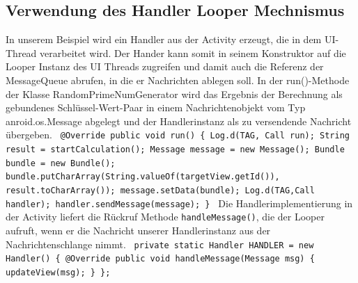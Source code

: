 \documentclass[12pt,oneside,a4paper,bibtotoc,liststotoc]{scrreprt}
\begin{document}
\subsection{Verwendung des Handler Looper Mechnismus }
In unserem Beispiel wird ein Handler aus der Activity erzeugt, die in dem UI-Thread verarbeitet wird. Der Hander kann somit in seinem Konstruktor auf die Looper Instanz des UI Threads zugreifen und damit auch die Referenz der MessageQueue abrufen, in die er Nachrichten ablegen soll. In der run()-Methode der Klasse RandomPrimeNumGenerator wird das Ergebnis der Berechnung als gebundenes Schlüssel-Wert-Paar in einem Nachrichtenobjekt vom Typ anroid.os.Message abgelegt und der Handlerinstanz als zu versendende Nachricht übergeben.\newline\newline
\texttt{
@Override\newline
public void run()\newline
  \{\newline
     Log.d(TAG, \grqq Call run\grqq);\newline
       String result = startCalculation();\newline
       Message message = new Message();\newline
       Bundle bundle = new Bundle();\newline
       bundle.putCharArray(String.valueOf(targetView.getId()),
                           result.toCharArray());
       message.setData(bundle);\newline
       Log.d(TAG,\grqq Call handler\grqq);\newline
       handler.sendMessage(message);\newline
 \}\newline
}\newline
Die Handlerimplementierung in der Activity liefert die Rückruf Methode \texttt{handleMessage()}, die der Looper aufruft, wenn er die Nachricht unserer Handlerinstanz aus der Nachrichtenschlange nimmt.\newline\newline
\texttt{ 
private static Handler HANDLER = new Handler()\newline
  \{\newline
     @Override\newline
     public void handleMessage(Message msg)\newline
     \{\newline
        updateView(msg);\newline
     \}\newline
  \};\newline
}\newline
\end{document}

